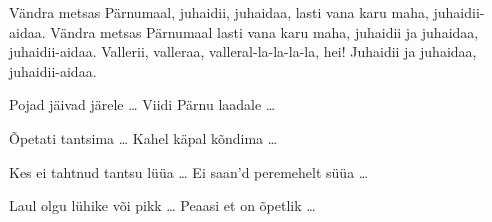 V\"andra metsas P\"arnumaal, juhaidii, juhaidaa,
lasti vana karu maha, juhaidii-aidaa.
V\"andra metsas P\"arnumaal lasti vana karu maha,
juhaidii ja juhaidaa, 
juhaidii-aidaa.
Vallerii, valleraa,
valleral-la-la-la-la, hei!
Juhaidii ja juhaidaa,
juhaidii-aidaa.

Pojad j\"aivad j\"arele \ldots
Viidi P\"arnu laadale \ldots

\~Opetati tantsima \ldots
Kahel k\"apal k\~ondima \ldots

Kes ei tahtnud tantsu l\"u\"ua \ldots
Ei saan'd peremehelt s\"u\"ua \ldots

Laul olgu l\"uhike v\~oi pikk \ldots
Peaasi et on \~opetlik \ldots